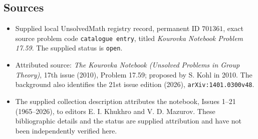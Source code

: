 \documentclass[11pt]{article}
\begin{document}
\subsection{Sources}
\begin{itemize}
\item Supplied local UnsolvedMath registry record, permanent ID \(701361\), exact source problem code \texttt{catalogue entry}, titled \emph{Kourovka Notebook Problem 17.59}. The supplied status is \texttt{open}.
\item Attributed source: \emph{The Kourovka Notebook (Unsolved Problems in Group Theory)}, 17th issue (2010), Problem 17.59; proposed by S. Kohl in 2010. The background also identifies the 21st issue edition (2026), \texttt{arXiv:1401.0300v48}.
\item The supplied collection description attributes the notebook, Issues 1--21 (1965--2026), to editors E. I. Khukhro and V. D. Mazurov. These bibliographic details and the status are supplied attribution and have not been independently verified here.
\end{itemize}
\end{document}

